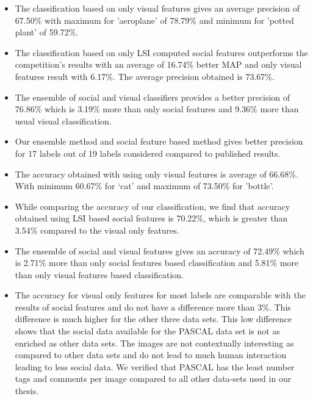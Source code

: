 \begin{itemize}
\item The classification based on only visual features gives an average precision of 67.50\% with maximum for 'aeroplane' of 78.79\%
and minimum for 'potted plant' of 59.72\%.
\item The classification based on only LSI computed social features outperforms the competition's results with an average of 16.74\%
better MAP and only visual features result with 6.17\%. The average precision obtained is 73.67\%.
\item The ensemble of social and visual classifiers provides a better precision of 76.86\% which is 3.19\% more than only social features
and 9.36\% more than usual visual classification.
\item Our ensemble method and social feature based method gives better precision for 17 labels out of 19 labels considered compared
to published results.
\item The accuracy obtained with using only visual features is average of 66.68\%. With minimum 60.67\% for `cat' and maximum of
73.50\% for 'bottle'.
\item While comparing the accuracy of our classification, we find that accuracy obtained using LSI based social features is 70.22\%,
which is greater than 3.54\% compared to the visual only features.
\item The ensemble of social and visual features gives an accuracy of 72.49\% which is 2.71\% more than only social features based
classification and 5.81\% more than only visual features based classification.
\item The accuracy for visual only features for most labels are comparable with the results of social features and do not have a difference more than 3\%. This difference is much higher for the other three data sets. This low difference shows that the social data available for the PASCAL data set is not as enriched as other data sets. The images are not contextually interesting as compared to other data sets and do not lead to much human interaction leading to less social data. We verified that PASCAL has the least number tags and comments per image compared to all other data-sets used in our thesis.
\end{itemize}

